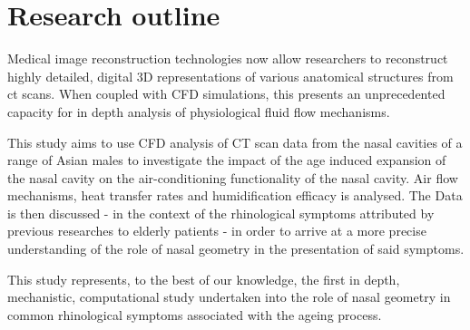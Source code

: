 \section{Research outline}

Medical image reconstruction technologies now allow researchers to reconstruct highly detailed, digital 3D representations of various anatomical structures from ct scans. When coupled with CFD simulations, this presents an unprecedented capacity for in depth analysis of physiological fluid flow mechanisms.

This study aims to use CFD analysis of CT scan data from the nasal cavities of a range of Asian males to investigate the impact of the age induced expansion of the nasal cavity on the air-conditioning functionality of the nasal cavity. Air flow mechanisms, heat transfer rates and humidification efficacy is analysed. The Data is then discussed - in the context of the rhinological symptoms attributed by previous researches to elderly patients - in order to arrive at a more precise understanding of the role of nasal geometry in the presentation of said symptoms.

This study represents, to the best of our knowledge, the first in depth, mechanistic, computational study undertaken into the role of nasal geometry in common rhinological symptoms associated with the ageing process.
